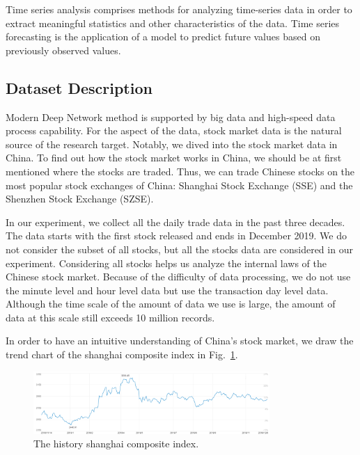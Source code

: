 \documentclass{article}
\begin{document}
Time series analysis comprises methods for analyzing time-series data in order to extract meaningful statistics and other characteristics of the data. Time series forecasting is the application of a model to predict future values based on previously observed values.

\subsection{Dataset Description}
Modern Deep Network method is supported by big data and high-speed data process capability. For the aspect of the data, stock market data is the natural source of the research target. Notably, we dived into the stock market data in China. To find out how the stock market works in China, we should be at first mentioned where the stocks are traded. Thus, we can trade Chinese stocks on the most popular stock exchanges of China: Shanghai Stock Exchange (SSE) and the Shenzhen Stock Exchange (SZSE).

In our experiment, we collect all the daily trade data in the past three decades. The data starts with the first stock released and ends in December 2019. We do not consider the subset of all stocks, but all the stocks data are considered in our experiment. Considering all stocks helps us analyze the internal laws of the Chinese stock market. Because of the difficulty of data processing, we do not use the minute level and hour level data but use the transaction day level data. Although the time scale of the amount of data we use is large, the amount of data at this scale still exceeds 10 million records.

In order to have an intuitive understanding of China’s stock market, we draw the trend chart of the shanghai composite index in Fig.~\ref{fig:SZZZ}.

\begin{figure}[!htp]
	\begin{centering}
		\includegraphics[width=0.8\textwidth]{SZZZ.png}
		\caption{The history shanghai composite index.}
		\label{fig:SZZZ} 
	\end{centering}
\end{figure}

%
\end{document}
